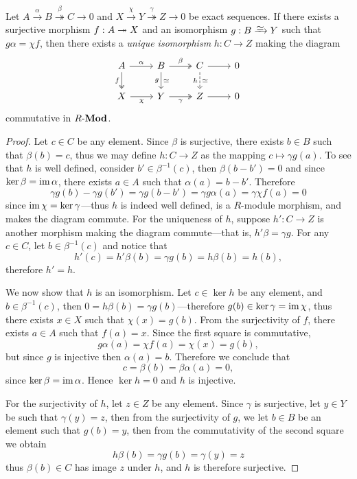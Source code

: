 \begin{proposition}
\label{prop:unique-isomorphism-exact-sequences-right}
Let \(A \xrightarrow \alpha B \overset{\beta}\twoheadrightarrow C \to 0\) and
\(X \xrightarrow{\chi} Y \overset{\gamma}\twoheadrightarrow Z \to 0\) be exact
sequences. If there exists a surjective morphism \(f: A \twoheadrightarrow X\) and an
isomorphism \(g: B \isoto Y\) such that \(g \alpha = \chi f\), then there exists
a \emph{unique isomorphism} \(h: C \to Z\) making the diagram
\[
\begin{tikzcd}
A \ar[r, "\alpha"] \ar[d, two heads, "f"']
&B \ar[r, two heads, "\beta"] \ar[d, "g"', "\dis"]
&C \ar[r] \ar[d, dashed, "h"', "\dis"]
&0 \\
X \ar[r, "\chi"'] &Y \ar[r, two heads, "\gamma"'] &Z \ar[r] &0
\end{tikzcd}
\]
commutative in \({R\text{-}\textbf{Mod}}\).
\end{proposition}

\begin{proof}
Let \(c \in C\) be any element. Since \(\beta\) is surjective, there exists
\(b \in B\) such that \(\beta(b) = c\), thus we may define \(h: C \to Z\) as the
mapping \(c \mapsto \gamma g(a)\). To see that \(h\) is well defined, consider
\(b' \in \beta^{-1}(c)\), then \(\beta(b - b') = 0\) and since \(\ker \beta =
\operatorname{im} \alpha\), there exists \(a \in A\) such that \(\alpha(a) = b -
b'\). Therefore
\[
\gamma g(b) - \gamma g(b') = \gamma g(b - b')
= \gamma g \alpha(a) = \gamma \chi f(a)
= 0
\]
since \(\operatorname{im} \chi = \ker \gamma\)---thus \(h\) is indeed well defined, is a
\(R\)-module morphism, and makes the diagram commute. For the uniqueness of
\(h\), suppose \(h': C \to Z\) is another morphism making the diagram
commute---that is, \(h' \beta = \gamma g\). For any \(c \in C\), let
\(b \in \beta^{-1}(c)\) and notice that
\[
h'(c) = h'\beta(b) = \gamma g(b) = h \beta(b) = h(b),
\]
therefore \(h' = h\).

We now show that \(h\) is an isomorphism. Let \(c \in \ker h\) be any element,
and \(b \in \beta^{-1}(c)\), then \(0 = h \beta(b) = \gamma g(b)\)---therefore
\(g(b) \in \ker \gamma = \operatorname{im} \chi\), thus there exists \(x \in X\) such that
\(\chi(x) = g(b)\). From the surjectivity of \(f\), there exists \(a \in A\)
such that \(f(a) = x\). Since the first square is commutative,
\[
g \alpha(a) = \chi f(a) = \chi(x) = g(b),
\]
but since \(g\) is injective then \(\alpha(a) = b\). Therefore we conclude that
\[
c = \beta(b) = \beta \alpha(a) = 0,
\]
since \(\ker \beta = \operatorname{im} \alpha\). Hence \(\ker h = 0\) and \(h\) is injective.

For the surjectivity of \(h\), let \(z \in Z\) be any element. Since \(\gamma\)
is surjective, let \(y \in Y\) be such that \(\gamma(y) = z\), then from the
surjectivity of \(g\), we let \(b \in B\) be an element such that \(g(b) = y\),
then from the commutativity of the second square we obtain
\[
h \beta(b) = \gamma g(b) = \gamma(y) = z
\]
thus \(\beta(b) \in C\) has image \(z\) under \(h\), and \(h\) is therefore
surjective.
\end{proof}


